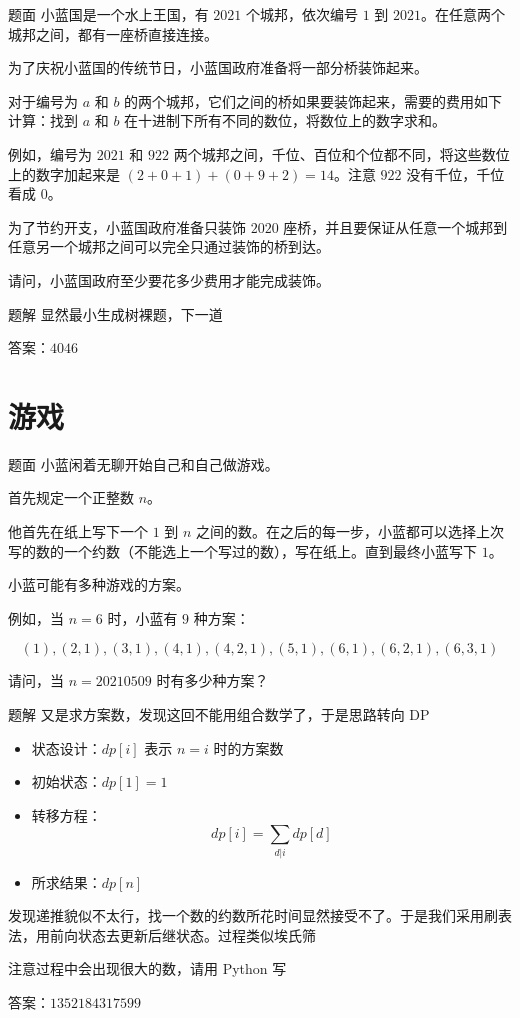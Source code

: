 \documentclass{pptt}
\begin{document}
\begin{frame}{题面}
    小蓝国是一个水上王国，有 $2021$ 个城邦，依次编号 $1$ 到 $2021$。在任意两个城邦之间，都有一座桥直接连接。

    为了庆祝小蓝国的传统节日，小蓝国政府准备将一部分桥装饰起来。

    对于编号为 $a$ 和 $b$ 的两个城邦，它们之间的桥如果要装饰起来，需要的费用如下计算：找到 $a$ 和 $b$ 在十进制下所有不同的数位，将数位上的数字求和。

    例如，编号为 $2021$ 和 $922$ 两个城邦之间，千位、百位和个位都不同，将这些数位上的数字加起来是 $(2+0+1)+(0+9+2)=14$。注意 $922$ 没有千位，千位看成 $0$。

    为了节约开支，小蓝国政府准备只装饰 $2020$ 座桥，并且要保证从任意一个城邦到任意另一个城邦之间可以完全只通过装饰的桥到达。

    请问，小蓝国政府至少要花多少费用才能完成装饰。
\end{frame}

\begin{frame}{题解}
    显然最小生成树裸题，下一道

    答案：$4046$
\end{frame}

\section{游戏}

\begin{frame}{题面}
    小蓝闲着无聊开始自己和自己做游戏。

    首先规定一个正整数 $n$。

    他首先在纸上写下一个 $1$ 到 $n$ 之间的数。在之后的每一步，小蓝都可以选择上次写的数的一个约数（不能选上一个写过的数），写在纸上。直到最终小蓝写下 $1$。

    小蓝可能有多种游戏的方案。

    例如，当 $n=6$ 时，小蓝有 $9$ 种方案：
    
    $$(1), (2,1), (3,1), (4,1), (4,2,1), (5,1), (6,1), (6,2,1), (6,3,1)$$

    请问，当 $n=20210509$ 时有多少种方案？
\end{frame}

\begin{frame}{题解}
    又是求方案数，发现这回不能用组合数学了，于是思路转向 DP

    \begin{itemize}
        \item 状态设计：$dp[i]$ 表示 $n=i$ 时的方案数
        \item 初始状态：$dp[1] = 1$
        \item 转移方程：$$dp[i] = \sum_{d|i} dp[d]$$
        \item 所求结果：$dp[n]$
    \end{itemize}

    发现递推貌似不太行，找一个数的约数所花时间显然接受不了。于是我们采用刷表法，用前向状态去更新后继状态。过程类似埃氏筛

    注意过程中会出现很大的数，请用 Python 写

    答案：$1352184317599$
\end{frame}
\end{document}
